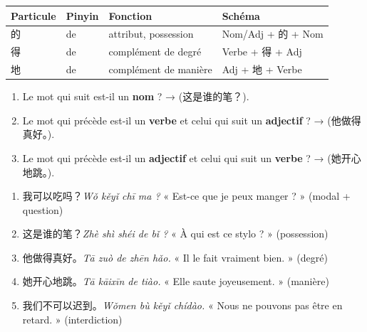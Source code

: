 \documentclass[11pt]{article}
\newcommand{\zh}[1]{\ifmmode\text{#1}\else{#1}\fi}
\begin{document}
\begin{center}
\begin{tabularx}{\linewidth}{|X|X|X|X|}
\hline
\rowcolor{popblueL} Particule & Pinyin & Fonction & Schéma \\
\hline
的 & de & attribut, possession & Nom/Adj + 的 + Nom \\
\hline
得 & de & complément de degré & Verbe + 得 + Adj \\
\hline
地 & de & complément de manière & Adj + 地 + Verbe \\
\hline
\end{tabularx}
\end{center}

\begin{methode}
\begin{enumerate}
\item Le mot qui suit est-il un \textbf{nom} ? → \zh{的} (这是谁的笔？).
\item Le mot qui précède est-il un \textbf{verbe} et celui qui suit un \textbf{adjectif} ? → \zh{得} (他做得真好。).
\item Le mot qui précède est-il un \textbf{adjectif} et celui qui suit un \textbf{verbe} ? → \zh{地} (她开心地跳。).
\end{enumerate}
\end{methode}

\begin{exemplebox}
\begin{enumerate}
\item 我可以吃吗？\emph{Wǒ kěyǐ chī ma ?} « Est-ce que je peux manger ? » (modal + question)
\item 这是谁的笔？\emph{Zhè shì shéi de bǐ ?} « À qui est ce stylo ? » (possession)
\item 他做得真好。\emph{Tā zuò de zhēn hǎo.} « Il le fait vraiment bien. » (degré)
\item 她开心地跳。\emph{Tā kāixīn de tiào.} « Elle saute joyeusement. » (manière)
\item 我们不可以迟到。\emph{Wǒmen bù kěyǐ chídào.} « Nous ne pouvons pas être en retard. » (interdiction)
\end{enumerate}
\end{exemplebox}
\end{document}

